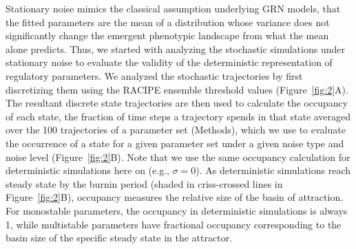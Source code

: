 \documentclass[11pt]{article}
\providecommand{\DIFaddtex}[1]{{\protect\color{red}#1}} %
\providecommand{\DIFdeltex}[1]{} %
\providecommand{\DIFaddbegin}{} %
\providecommand{\DIFaddend}{} %
\providecommand{\DIFdelbegin}{} %
\providecommand{\DIFdelend}{} %
\providecommand{\DIFadd}[1]{\texorpdfstring{\DIFaddtex{#1}}{#1}} %
\providecommand{\DIFdel}[1]{\texorpdfstring{\DIFdeltex{#1}}{}} %
\providecommand{\DIFaddincludegraphics}[2][]{\DIFOincludegraphics[#1]{#2}} %
\providecommand{\DIFdelincludegraphics}[2][]{}
\DeclareRobustCommand{\DIFaddbegin}{\DIFOaddbegin \let\includegraphics\DIFaddincludegraphics} %
\DeclareRobustCommand{\DIFaddend}{\DIFOaddend \let\includegraphics\DIFOincludegraphics} %
\DeclareRobustCommand{\DIFdelbegin}{\DIFOdelbegin \let\includegraphics\DIFdelincludegraphics} %
\DeclareRobustCommand{\DIFdelend}{\DIFOaddend \let\includegraphics\DIFOincludegraphics} %
\begin{document}
Stationary noise mimics the classical assumption underlying GRN models, that the fitted parameters are the mean of a distribution whose variance does not significantly change the emergent phenotypic landscape from what the mean alone predicts. Thus, we started with analyzing the stochastic simulations under stationary noise to evaluate the validity of the deterministic representation of regulatory parameters. We analyzed the stochastic trajectories by first discretizing them using the RACIPE ensemble threshold values (Figure~\ref{fig:2}A). The resultant discrete state trajectories are then used to calculate the \DIFdelbegin \DIFdel{residence time }\DIFdelend \DIFaddbegin \DIFadd{occupancy }\DIFaddend of each state, \DIFdelbegin \DIFdel{defined as }\DIFdelend the fraction of time steps a \DIFdelbegin \DIFdel{given trajectory sees that state . An average of the residence time over }\DIFdelend \DIFaddbegin \DIFadd{trajectory spends in that state averaged over the }\DIFaddend 100 trajectories \DIFdelbegin \DIFdel{, the mean residence time (MRT)is used }\DIFdelend \DIFaddbegin \DIFadd{of a parameter set (Methods), which we use }\DIFaddend to evaluate the occurrence of a state for a given parameter set under a given noise type and noise level (Figure~\ref{fig:2}B). Note that we use the same \DIFdelbegin \DIFdel{MRT }\DIFdelend \DIFaddbegin \DIFadd{occupancy }\DIFaddend calculation for deterministic simulations here on (e.g., $\sigma = 0$). As deterministic simulations reach steady state by the burnin period (shaded in criss-crossed lines in Figure~\ref{fig:2}B), \DIFdelbegin \DIFdel{the MRT }\DIFdelend \DIFaddbegin \DIFadd{occupancy }\DIFaddend measures the relative size of the basin of attraction. For monostable parameters, \DIFdelbegin \DIFdel{MRT }\DIFdelend \DIFaddbegin \DIFadd{the occupancy }\DIFaddend in deterministic simulations \DIFdelbegin \DIFdel{will always be }\DIFdelend \DIFaddbegin \DIFadd{is always }\DIFaddend 1, while multistable parameters \DIFdelbegin \DIFdel{will see fractional MRT }\DIFdelend \DIFaddbegin \DIFadd{have fractional occupancy }\DIFaddend corresponding to the basin size of the specific steady state in the attractor. 
\end{document}
